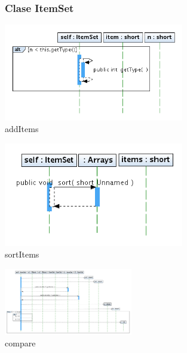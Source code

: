 \begin{figure}
\subsubsection{Clase ItemSet}
\centering
\includegraphics[width=0.7\textwidth]{imgsSecuencia/ItemSet/addItems.png}
\caption{addItems}
\end{figure}
\newpage
\begin{figure}
\centering
\includegraphics[width=0.7\textwidth]{imgsSecuencia/ItemSet/sortItems.png}
\caption{sortItems}
\end{figure}
\newpage
\begin{figure}
\centering
\includegraphics[angle=90, width=0.5\textwidth]{imgsSecuencia/ItemSet/compare.png}
\caption{compare}
\end{figure}
\newpage

